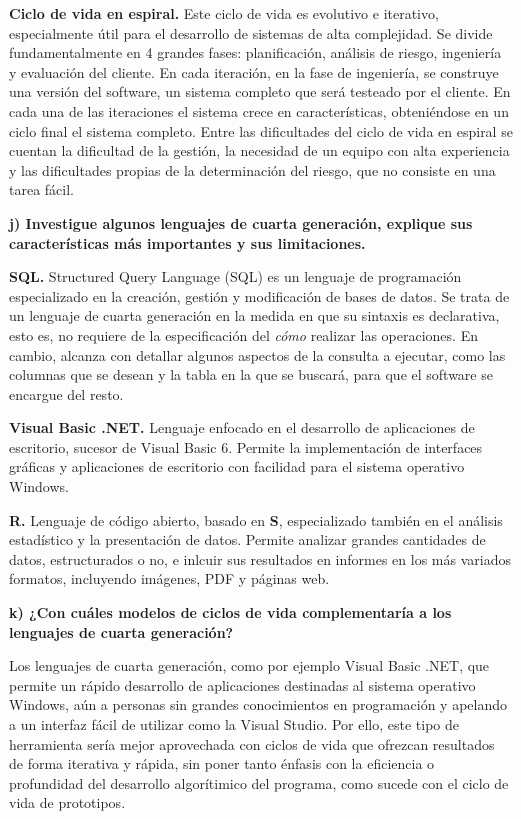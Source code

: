 \documentclass[12pt]{article}
\begin{document}
\textbf{Ciclo de vida en espiral.}
Este ciclo de vida es evolutivo e iterativo, especialmente útil para el 
desarrollo de sistemas de alta complejidad. Se divide fundamentalmente en 
4 grandes fases: planificación, análisis de riesgo, ingeniería y evaluación del
cliente. 
En cada iteración, en la fase de ingeniería, se construye una versión del software,
un sistema completo que será testeado por el cliente. En cada una de las iteraciones 
el sistema crece en características, obteniéndose en un ciclo final el sistema 
completo. Entre las dificultades del ciclo de vida en espiral se cuentan la 
dificultad de la gestión, la necesidad de un equipo con alta experiencia y 
las dificultades propias de la determinación del riesgo, que no consiste en una 
tarea fácil. 

\textbf{j) Investigue algunos lenguajes de cuarta generación, explique sus características más importantes y sus limitaciones.}

\textbf{SQL.}
Structured Query Language (SQL) es un lenguaje de programación especializado
en la creación, gestión y modificación de bases de datos. Se trata de un 
lenguaje de cuarta generación en la medida en que su sintaxis es declarativa,
esto es, no requiere de la especificación del \textit{cómo} realizar las operaciones.
En cambio, alcanza con detallar algunos aspectos de la consulta a ejecutar,
como las columnas que se desean y la tabla en la que se buscará, para que el 
software se encargue del resto.

\textbf{Visual Basic .NET.}
Lenguaje enfocado en el desarrollo de aplicaciones de escritorio, sucesor de 
Visual Basic 6. Permite la implementación de interfaces gráficas y 
aplicaciones de escritorio con facilidad para el sistema operativo Windows.

\textbf{R.}
Lenguaje de código abierto, basado en \textbf{S}, especializado también en el
análisis estadístico y la presentación de datos. Permite analizar grandes 
cantidades de datos, estructurados o no, e inlcuir sus resultados en informes
en los más variados formatos, incluyendo imágenes, PDF y páginas web.

\textbf{k) ¿Con cuáles modelos de ciclos de vida complementaría a los lenguajes de cuarta generación? }

Los lenguajes de cuarta generación, como por ejemplo Visual Basic .NET, que 
permite un rápido desarrollo de aplicaciones destinadas al sistema operativo 
Windows, aún a personas sin grandes conocimientos en programación y apelando 
a un interfaz fácil de utilizar como la Visual Studio. Por ello, este tipo de 
herramienta sería mejor aprovechada con ciclos de vida que ofrezcan resultados 
de forma iterativa y rápida, sin poner tanto énfasis con la eficiencia o 
profundidad del desarrollo algorítimico del programa, como sucede con el ciclo 
de vida de prototipos.
\end{document}
